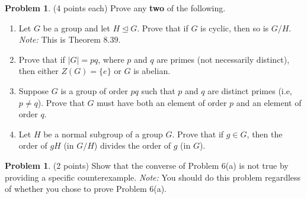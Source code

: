 \documentclass[11pt]{article}
\theoremstyle{definition}
\newtheorem{problem}[theorem]{Problem}
\begin{document}
\begin{problem}
(4 points each) Prove any \textbf{two} of the following.
\begin{enumerate}[label=\rm{(\alph*)}]
\item Let $G$ be a group and let $H\trianglelefteq G$.  Prove that if $G$ is cyclic, then so is $G/H$. \emph{Note:} This is Theorem 8.39.
\item Prove that if $|G|=pq$, where $p$ and $q$ are primes (not necessarily distinct), then either $Z(G)=\{e\}$ or $G$ is abelian.
\item Suppose $G$ is a group of order $pq$ such that $p$ and $q$ are distinct primes (i.e, $p\neq q$). Prove that $G$ must have both an element of order $p$ and an element of order $q$.
\item Let $H$ be a normal subgroup of a group $G$.  Prove that if $g\in G$, then the order of $gH$ (in $G/H$) divides the order of $g$ (in $G$).
\end{enumerate}
\end{problem}

\begin{problem}
(2 points) Show that the converse of Problem 6(a) is not true by providing a specific counterexample. \emph{Note:} You should do this problem regardless of whether you chose to prove Problem 6(a).
\end{problem}
\end{document}
